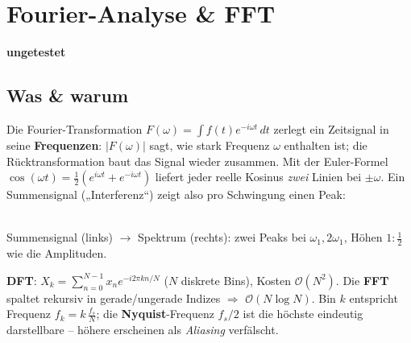 \documentclass[a4paper,11pt]{article}
\newcommand{\chip}[2]{{\setlength{\fboxsep}{2.5pt}\colorbox{#1}{\color{bgdark}\footnotesize\bfseries #2}}}
\newcommand{\offen}{\chip{muted}{ungetestet}}
\begin{document}
\section{Fourier-Analyse \& FFT}
\offen

\subsection{Was \& warum}
Die Fourier-Transformation $F(\omega)=\int f(t)e^{-i\omega t}\,dt$ zerlegt ein Zeitsignal in seine
\textbf{Frequenzen}: $|F(\omega)|$ sagt, wie stark Frequenz $\omega$ enthalten ist; die
Rücktransformation baut das Signal wieder zusammen. Mit der Euler-Formel
$\cos(\omega t)=\tfrac12(e^{i\omega t}+e^{-i\omega t})$ liefert jeder reelle Kosinus \emph{zwei}
Linien bei $\pm\omega$. Ein Summensignal („Interferenz``) zeigt also pro Schwingung einen Peak:

\begin{center}
\\[-1pt]
{\footnotesize\color{muted}Summensignal (links) $\to$ Spektrum (rechts): zwei Peaks bei $\omega_1,2\omega_1$, Höhen $1:\tfrac12$ wie die Amplituden.}
\end{center}

\textbf{DFT}: $X_k=\sum_{n=0}^{N-1}x_n e^{-i2\pi kn/N}$ ($N$ diskrete Bins), Kosten $\mathcal O(N^2)$.
Die \textbf{FFT} spaltet rekursiv in gerade/ungerade Indizes $\Rightarrow$ $\mathcal O(N\log N)$.
Bin $k$ entspricht Frequenz $f_k=k\,\frac{f_s}{N}$; die \textbf{Nyquist}-Frequenz $f_s/2$ ist die
höchste eindeutig darstellbare -- höhere erscheinen als \emph{Aliasing} verfälscht.
\end{document}
